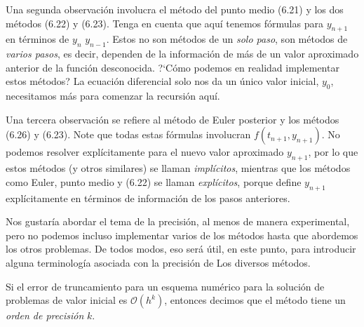 Una segunda observación involucra el método del punto medio (6.21) y los dos métodos (6.22) y (6.23). Tenga en cuenta que aquí tenemos fórmulas para $y_{n+1}$ en términos de $y_{n}$ $y_{n-1}$. Estos no son métodos de un \emph{solo paso}, son métodos de \emph{varios pasos}, es decir, dependen de la información de más de un valor aproximado anterior de la función desconocida. ?`Cómo podemos en realidad implementar estos métodos? La ecuación diferencial solo nos da un único valor inicial, $y_{0}$, necesitamos más para comenzar la recursión aquí.


Una tercera observación se refiere al método de Euler posterior y los métodos (6.26) y (6.23). Note que todas estas fórmulas involucran $f\left(t_{n+1},y_{n+1}\right)$. No podemos resolver explícitamente para el nuevo valor aproximado $y_{n+1}$, por lo que estos métodos (y otros similares) se llaman \emph{implícitos}, mientras que los métodos como Euler, punto medio y (6.22) se llaman \emph{explícitos}, porque define $y_{n+1}$ explícitamente en términos de información de los pasos anteriores.


Nos gustaría abordar el tema de la precisión, al menos de manera experimental, pero no podemos incluso implementar varios de los métodos hasta que abordemos los otros problemas. De todos modos, eso será útil, en este punto, para introducir alguna terminología asociada con la precisión de Los diversos métodos.

\begin{definition}
Si el error de truncamiento para un esquema numérico para la solución de problemas de valor inicial es $\mathcal{O}\left(h^{k}\right)$, entonces decimos que el método tiene un \emph{orden de precisión} $k$.
\end{definition}



